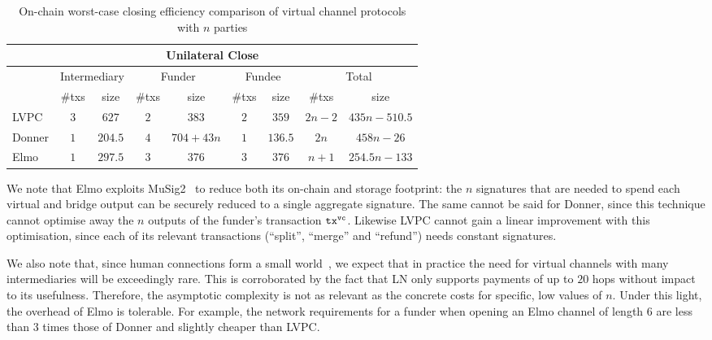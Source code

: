   \addtolength{\intextsep}{-25pt}
  \begin{table}[h!]
    \begin{minipage}{\textwidth}
    \centering
    \begin{tabular}{|l|c|c|c|c|c|c|c|c|}
    \hline
    \multicolumn{9}{|c|}{Unilateral Close} \\
    \hline
              & \multicolumn{2}{|c|}{Intermediary}
              & \multicolumn{2}{|c|}{Funder} & \multicolumn{2}{|c|}{Fundee}
              & \multicolumn{2}{|c|}{Total} \\
    \hline
              & \#txs & size & \#txs & size & \#txs & size & \#txs & size \\
    \hline
    LVPC      & $3$ & $627$ & $2$ & $383$ & $2$ & $359$ & $2n-2$ & $435n -
              510.5$ \\
    \hline
    Donner    & $1$ & $204.5$ & $4$ & $704 + 43n$ & $1$ & $136.5$ & $2n$ & $458n
              - 26$ \\
    \hline
    Elmo      & $1$ & $297.5$ & $3$ & $376$ & $3$ & $376$
              & $n+1$ & $254.5n-133$ \\
    \hline
    \end{tabular}
    \end{minipage}
    \caption{On-chain worst-case closing efficiency comparison of virtual
    channel protocols with $n$ parties}
    \label{table:comparison:overhead:n-parties:close}
  \end{table}
  \addtolength{\intextsep}{25pt}

  We note that Elmo exploits
  MuSig2~\cite{DBLP:journals/dcc/MaxwellPSW19,DBLP:conf/crypto/NickRS21} to
  reduce both its
  on-chain and storage footprint: the $n$ signatures that are needed to spend
  each virtual and bridge output can be securely reduced to a single aggregate
  signature. The same cannot be said for
  Donner, since this technique cannot optimise away the $n$ outputs of the
  funder's transaction $\texttt{tx}^{\mathtt{vc}}$. Likewise LVPC cannot gain a linear
  improvement with this optimisation, since each of its relevant transactions
  (``split'', ``merge'' and ``refund'') needs constant signatures.

  We also note that, since human connections form a
  small world~\cite{smallworld}, we expect that in practice the
  need for virtual channels with many
  intermediaries will be exceedingly rare. This is corroborated by
  the fact that LN only supports payments of up to $20$ hops
  without impact to its usefulness. Therefore, the asymptotic
  complexity is not as relevant as the
  concrete costs for specific, low values of $n$. Under this
  light, the overhead of Elmo is tolerable. For example, the
  network requirements for a funder when opening an Elmo channel
  of length $6$ are less than $3$ times those of Donner and
  slightly cheaper than LVPC.

